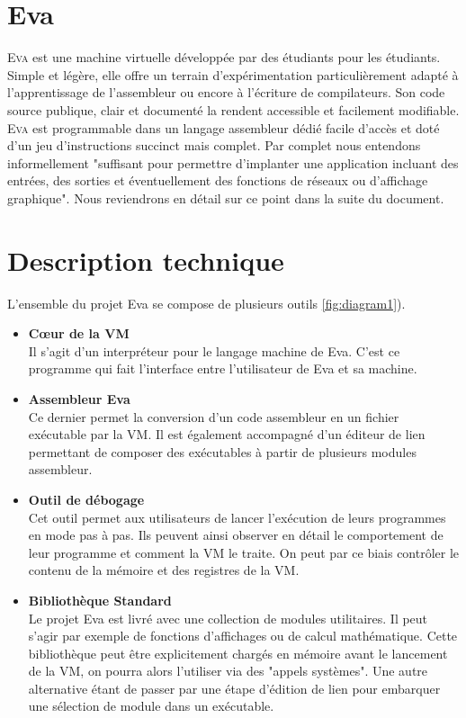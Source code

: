 \documentclass[11pt,twoside,french]{article}
\newcommand{\noun}[1]{\textsc{#1}}
\newcommand{\noun}[1]{\textsc{#1}}
\begin{document}
\vfill{}
\newpage{}

\section{Eva}

\noun{Eva} est une machine virtuelle développée par des étudiants pour les
étudiants. Simple et légère, elle offre un terrain d'expérimentation
particulièrement adapté à l'apprentissage de l'assembleur ou encore
à l'écriture de compilateurs. Son code source publique, clair et documenté
la rendent accessible et facilement modifiable. \noun{Eva} est programmable
dans un langage assembleur dédié facile d'accès et doté d'un jeu d'instructions
succinct mais complet. Par complet nous entendons informellement "suffisant pour permettre d'implanter une application incluant des entrées, des sorties et éventuellement des fonctions de réseaux ou d'affichage graphique". Nous reviendrons en détail sur ce point dans la suite du document.

\vfill{}

\section{Description technique}

L'ensemble du projet Eva se compose de plusieurs outils \ref{fig:diagram1}).

\begin{itemize}
  \item \textbf{Cœur de la VM} \\
  Il s'agit d'un interpréteur pour le langage machine de Eva. C'est ce programme qui fait l'interface entre l'utilisateur de Eva et sa machine.

  \item \textbf{Assembleur Eva} \\
  Ce dernier permet la conversion d'un code assembleur en un fichier exécutable par la VM. Il est également accompagné d'un éditeur de lien permettant de composer des exécutables à partir de plusieurs modules assembleur.

  \item \textbf{Outil de débogage} \\
  Cet outil permet aux utilisateurs de lancer l’exécution de leurs programmes en mode pas à pas. Ils peuvent ainsi observer en détail le comportement de leur programme et comment la VM le traite. On peut par ce biais contrôler le contenu de la mémoire et des registres de la VM.


  \item \textbf{Bibliothèque Standard} \\
  Le projet Eva est livré avec une collection de modules utilitaires. Il peut s'agir par exemple de fonctions d'affichages ou de calcul mathématique. Cette bibliothèque peut être explicitement chargés en mémoire avant le lancement de la VM, on pourra alors l'utiliser via des "appels systèmes". Une autre alternative étant de passer par une étape d'édition de lien pour embarquer une sélection de module dans un exécutable.

\end{itemize}
\end{document}

